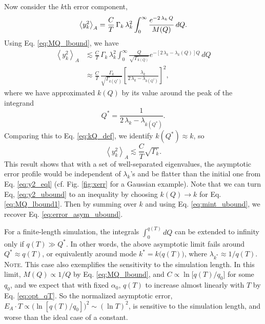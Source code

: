 \documentclass[reprint, floatfix]{revtex4-1}
\newcommand{\note}[1]{{\color{DarkGreen}\footnotesize \textsc{Note.} #1}}
\begin{document}
Now consider the $k$th error component, %
\begin{equation}
  \left\langle
    y_k^2
  \right\rangle_A
  =
  \frac C T \,
  \Gamma_k \, \lambda_k^2
  \int_0^\infty
    \frac{ e^{-2 \, \lambda_k \, Q} }
         { M(Q) }
    \, dQ
  .
\notag
\end{equation}
%
Using Eq. \eqref{eq:MQ_lbound}, we have
$$
\begin{aligned}
  \left\langle
    y_k^2
  \right\rangle_A
  &
  \lesssim
  \frac C T \, \Gamma_k \, \lambda_k^2
  \int_0^\infty
    \frac{ Q } { \sqrt{ \Gamma_{ k(Q) } } }
    e^{-\left[ 2\,\lambda_k - \lambda_k(Q) \right] Q }
    \, dQ
  \\
  &
  \approx
  \frac C T \,
  \frac{ \Gamma_k } { \sqrt{ \Gamma_{ k(Q^*) } } }
  \left[
    \frac{ \lambda_k } { 2 \, \lambda_k - \lambda_{ k(Q^*) } }
  \right]^2
  ,
\end{aligned}
$$
where we have approximated $k(Q)$
by its value around the peak of the integrand
$$
  Q^*
  =
  \frac{ 1 } { 2 \, \lambda_k - \lambda_{ k(Q^*) } }
  .
$$
%
Comparing this to Eq. \eqref{eq:kQ_def},
we identify $k(Q^*) \approx k$, so
\begin{equation}
  \left\langle
    y_k^2
  \right\rangle_A
  \lesssim
  \frac C T
  \sqrt{ \Gamma_k }
  .
  \label{eq:y2_ubound}
\end{equation}
%
This result shows that with a set of well-separated eigenvalues,
the asymptotic error profile would be
independent of $\lambda_k$'s and
be flatter than the initial one from
Eq. \eqref{eq:y2_eql}
(cf. Fig. \ref{fig:xerr}
for a Gaussian example).
%
Note that we can turn Eq, \eqref{eq:y2_ubound}
to an inequality by choosing $k(Q) \to k$
for Eq. \eqref{eq:MQ_lbound1}.
%
Then by summing over $k$
and using Eq. \eqref{eq:mint_ubound},
we recover Eq. \eqref{eq:error_asym_ubound}.


For a finite-length simulation,
the integrals $\int_0^{q(T)} dQ$
can be extended to infinity
only if $q(T) \gg Q^*$.
%
In other words,
the above asymptotic limit fails around
$Q^* \approx q(T)$, or equivalently
around mode $k^* = k\bigl( q(T) \bigr)$,
where $\lambda_{ k^* } \approx 1/q(T)$.
%
\note{This case also exemplifies
  the sensitivity to the simulation length.
  In this limit,
  $M(Q) \propto 1/Q$ by Eq. \eqref{eq:MQ_lbound},
  and $C \propto \ln\bigl[ q(T) / q_0 \bigr]$
  for some $q_0$,
  and we expect that with fixed $\alpha_0$,
  $q(T)$ to increase almost linearly with $T$
  by Eq. \eqref{eq:opt_qT}.
  So the normalized asymptotic error,
  $E_A \cdot T \propto \bigl( \ln[ q(T)/q_0 ] \bigr)^2 \sim (\ln T)^2$,
  is sensitive to the simulation length,
  and worse than the ideal case of a constant.
}
\end{document}
